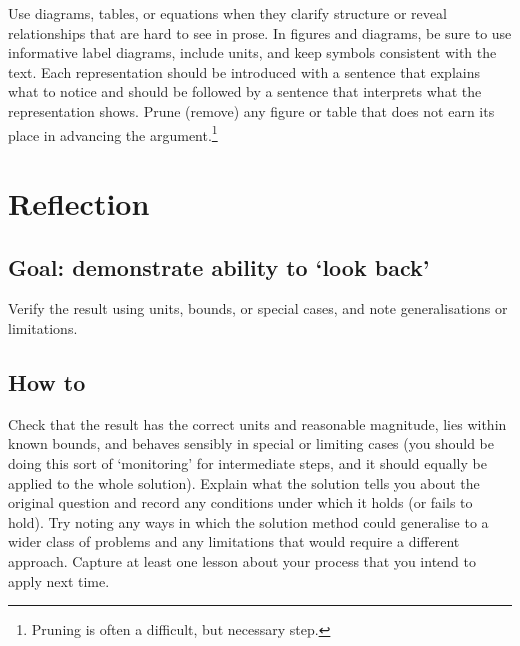 \documentclass[
  a4paper,
  DIV=11,
  numbers=noendperiod,
  oneside]{scrreprt}
\begin{document}
Use diagrams, tables, or equations when they clarify structure or reveal
relationships that are hard to see in prose. In figures and diagrams, be
sure to use informative label diagrams, include units, and keep symbols
consistent with the text. Each representation should be introduced with
a sentence that explains what to notice and should be followed by a
sentence that interprets what the representation shows. Prune (remove)
any figure or table that does not earn its place in advancing the
argument.\footnote{Pruning is often a difficult, but necessary step.}

\section{Reflection}\label{reflection}

\subsection{Goal: demonstrate ability to `look
back'}\label{goal-demonstrate-ability-to-look-back}

Verify the result using units, bounds, or special cases, and note
generalisations or limitations.

\subsection{How to}\label{how-to-5}

Check that the result has the correct units and reasonable magnitude,
lies within known bounds, and behaves sensibly in special or limiting
cases (you should be doing this sort of `monitoring' for intermediate
steps, and it should equally be applied to the whole solution). Explain
what the solution tells you about the original question and record any
conditions under which it holds (or fails to hold). Try noting any ways
in which the solution method could generalise to a wider class of
problems and any limitations that would require a different approach.
Capture at least one lesson about your process that you intend to apply
next time.
\end{document}
